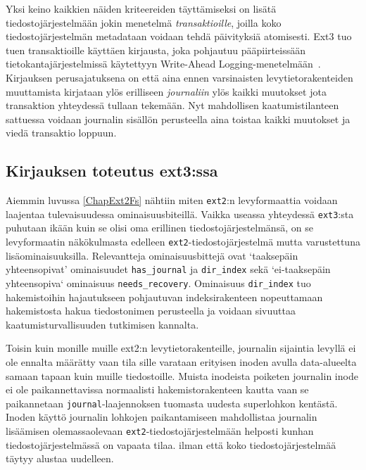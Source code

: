 Yksi keino kaikkien näiden kriteereiden täyttämiseksi on lisätä tiedostojärjestelmään jokin menetelmä \emph{transaktioille}, joilla koko tiedostojärjestelmän metadataan voidaan tehdä päivityksiä atomisesti.
Ext3 tuo tuen transaktioille käyttäen kirjausta, joka pohjautuu pääpiirteissään tietokantajärjestelmissä käytettyyn Write-Ahead Logging-menetelmään~\cite{AriesWal}.
Kirjauksen perusajatuksena on että aina ennen varsinaisten levytietorakenteiden muuttamista kirjataan ylös erilliseen \emph{journaliin} ylös kaikki muutokset jota transaktion yhteydessä tullaan tekemään.
Nyt mahdollisen kaatumistilanteen sattuessa voidaan journalin sisällön perusteella aina toistaa kaikki muutokset ja viedä transaktio loppuun.

%

\subsection{Kirjauksen toteutus ext3:ssa}
Aiemmin luvussa \ref{ChapExt2Fs} nähtiin miten \texttt{ext2}:n levyformaattia voidaan laajentaa tulevaisuudessa ominaisuusbiteillä.
Vaikka useassa yhteydessä \texttt{ext3}:sta puhutaan ikään kuin se olisi oma erillinen tiedostojärjestelmänsä,
on se levyformaatin näkökulmasta edelleen \texttt{ext2}-tiedostojärjestelmä mutta varustettuna lisäominaisuuksilla.
Relevantteja ominaisuusbittejä ovat `taaksepäin yhteensopivat' ominaisuudet \texttt{has\_journal} ja \texttt{dir\_index} sekä `ei-taaksepäin yhteensopiva` ominaisuus \texttt{needs\_recovery}.
Ominaisuus \texttt{dir\_index} tuo hakemistoihin hajautukseen pohjautuvan indeksirakenteen nopeuttamaan hakemistosta hakua tiedostonimen perusteella ja voidaan sivuuttaa kaatumisturvallisuuden tutkimisen kannalta.

Toisin kuin monille muille ext2:n levytietorakenteille, journalin sijaintia levyllä ei ole ennalta määrätty vaan tila sille varataan erityisen inoden avulla data-alueelta samaan tapaan kuin muille tiedostoille.
Muista inodeista poiketen journalin inode ei ole paikannettavissa normaalisti hakemistorakenteen kautta vaan se paikannetaan \texttt{journal}-laajennoksen tuomasta uudesta superlohkon kentästä.
Inoden käyttö journalin lohkojen paikantamiseen mahdollistaa journalin lisäämisen olemassaolevaan \texttt{ext2}-tiedostojärjestelmään helposti kunhan tiedostojärjestelmässä on vapaata tilaa.
ilman että koko tiedostojärjestelmää täytyy alustaa uudelleen.

